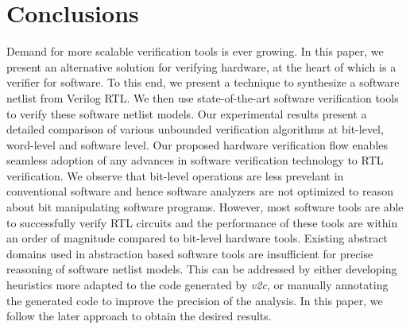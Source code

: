 \section{Conclusions}\label{sec:concl}
%
Demand for more scalable verification tools is ever growing.  In this
paper, we present an alternative solution for verifying hardware, at
the heart of which is a verifier for software.  To this end, we
present a technique to synthesize a software netlist from Verilog RTL.
We then use state-of-the-art software verification tools to verify
these software netlist models.  Our experimental results present a
detailed comparison of various unbounded verification algorithms at
bit-level, word-level and software level.  Our proposed hardware
verification flow enables seamless adoption of any advances in
software verification technology to RTL verification.  We observe that
bit-level operations are less prevelant in conventional software and
hence software analyzers are not optimized to reason about bit
manipulating software programs.  However, most software tools are able
to successfully verify RTL circuits and the performance of these tools
are within an order of magnitude compared to bit-level hardware tools.
Existing abstract domains used in abstraction based software tools are
insufficient for precise reasoning of software netlist models.  This
can be addressed by either developing heuristics more adapted to the
code generated by \emph{v2c}, or manually annotating the generated
code to improve the precision of the analysis. In this paper, we
follow the later approach to obtain the desired results.
